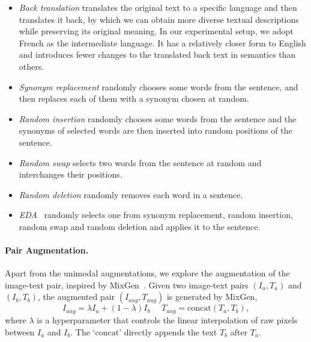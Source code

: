 \documentclass[letterpaper]{article} %
\begin{document}
\begin{itemize}
    \item \textit{Back translation} translates the original text to a specific language and then translates it back, by which we can obtain more diverse textual descriptions while preserving its original meaning.
    In our experimental setup, we adopt French as the intermediate language.
    It has a relatively closer form to English and introduces fewer changes to the translated back text in semantics than others.
    
    \item \textit{Synonym replacement} randomly chooses some words from the sentence, and then replaces each of them with a synonym chosen at random.

    \item \textit{Random insertion} randomly chooses some words from the sentence and the synonyms of selected words are then inserted into random positions of the sentence.
    
    \item \textit{Random swap} selects two words from the sentence at random and interchanges their positions. 

    \item \textit{Random deletion} randomly removes each word in a sentence.

    \item \textit{EDA}~\cite{wei2019eda} randomly selects one from synonym replacement, random insertion, random swap and random deletion and applies it to the sentence.
\end{itemize}

\iffalse
\paragraph{Pair Augmentation.}
Apart from the unimodal augmentations, we explore the augmentation of the image-text pair, inspired by MixGen~\cite{hao2023mixgen}.
Given two image-text pairs $(I_a, T_a)$ and $(I_b, T_b)$, the augmented pair $(I_{aug}, T_{aug})$ is generated by MixGen,
\begin{equation}
    I_{aug} = \lambda I_a+(1-\lambda)I_b ~~~~~~
    T_{aug} = \text{concat}(T_a, T_b),
\end{equation}
where $\lambda$ is a hyperparameter that controls the linear interpolation of raw pixels between $I_a$ and $I_b$. The `$\text{concat}$' directly appends the text $T_b$ after $T_a$.
\end{document}
